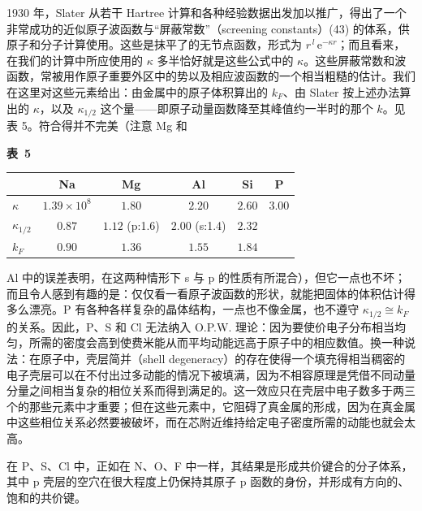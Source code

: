 1930 年，Slater 从若干 Hartree 计算和各种经验数据出发加以推广，得出了一个非常成功的近似原子波函数与“屏蔽常数”（screening constants）(43) 的体系，供原子和分子计算使用。这些是抹平了的无节点函数，形式为 $r^{\,l}\,\mathrm{e}^{-\kappa r}$；而且看来，在我们的计算中所应使用的 $\kappa$ 多半恰好就是这些公式中的 $\kappa$。这些屏蔽常数和波函数，常被用作原子重要外区中的势以及相应波函数的一个相当粗糙的估计。我们在这里对这些元素给出：由金属中的原子体积算出的 $k_F$、由 Slater 按上述办法算出的 $\kappa$，以及 $\kappa_{1/2}$ 这个量——即原子动量函数降至其峰值约一半时的那个 $k$。见表 5。符合得并不完美（注意 Mg 和

\begin{table}[htbp]
\centering
{\bfseries 表~5}\\[5pt]
\begin{tabular}{lccccc}
\toprule
 & Na & Mg & Al & Si & P\\
\midrule
$\kappa$ & $1.39\times10^{8}$ & $1.80$ & $2.20$ & $2.60$ & $3.00$\\
$\kappa_{1/2}$ & $0.87$ & $1.12$ (p:1.6) & $2.00$ (s:1.4) & $2.32$ & \\
$k_F$ & $0.90$ & $1.36$ & $1.55$ & $1.84$ & \\
\bottomrule
\end{tabular}
\end{table}

\noindent Al 中的误差表明，在这两种情形下 s 与 p 的性质有所混合），但它一点也不坏；而且令人感到有趣的是：仅仅看一看原子波函数的形状，就能把固体的体积估计得多么漂亮。P 有各种各样复杂的晶体结构，一点也不像金属，也不遵守 $\kappa_{1/2} \cong k_F$ 的关系。因此，P、S 和 Cl 无法纳入 O.P.W. 理论：因为要使价电子分布相当均匀，所需的密度会高到使费米能从而平均动能远高于原子中的相应数值。换一种说法：在原子中，壳层简并（shell degeneracy）的存在使得一个填充得相当稠密的电子壳层可以在不付出过多动能的情况下被填满，因为不相容原理是凭借不同动量分量之间相当复杂的相位关系而得到满足的。这一效应只在壳层中电子数多于两三个的那些元素中才重要；但在这些元素中，它阻碍了真金属的形成，因为在真金属中这些相位关系必然要被破坏，而在芯附近维持给定电子密度所需的动能也就会太高。

在 P、S、Cl 中，正如在 N、O、F 中一样，其结果是形成共价键合的分子体系，其中 p 壳层的空穴在很大程度上仍保持其原子 p 函数的身份，并形成有方向的、饱和的共价键。

